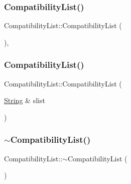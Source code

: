 \subsubsection{\texorpdfstring{CompatibilityList()}{CompatibilityList()}\hspace{0.1cm}{\footnotesize\ttfamily [1/2]}}
{\footnotesize\ttfamily Compatibility\+List\+::\+Compatibility\+List (\begin{DoxyParamCaption}{ }\end{DoxyParamCaption})\hspace{0.3cm}{\ttfamily [inline]}, {\ttfamily [explicit]}}

\mbox{\label{class_compatibility_list_af34d724919febac11f933a4d42f3d550}} 
\subsubsection{\texorpdfstring{CompatibilityList()}{CompatibilityList()}\hspace{0.1cm}{\footnotesize\ttfamily [2/2]}}
{\footnotesize\ttfamily Compatibility\+List\+::\+Compatibility\+List (\begin{DoxyParamCaption}\item[{\mbox{\hyperlink{class_string}{String}} \&}]{slist }\end{DoxyParamCaption})\hspace{0.3cm}{\ttfamily [explicit]}}

\mbox{\label{class_compatibility_list_ac3f2eebda805a5b587c498a4915161fc}} 
\subsubsection{\texorpdfstring{$\sim$CompatibilityList()}{~CompatibilityList()}}
{\footnotesize\ttfamily Compatibility\+List\+::$\sim$\+Compatibility\+List (\begin{DoxyParamCaption}{ }\end{DoxyParamCaption})\hspace{0.3cm}{\ttfamily [inline]}}




